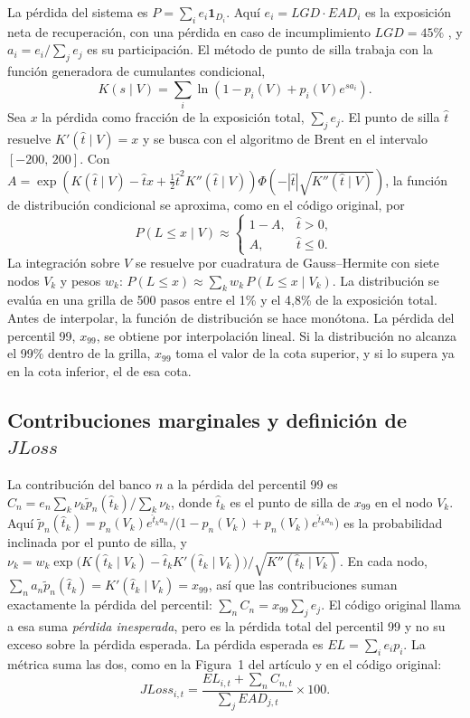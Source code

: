 La pérdida del sistema es $P=\sum_i e_i\mathbf 1_{D_i}$. Aquí $e_i=LGD\cdot EAD_i$ es la exposición neta de recuperación, con una pérdida en caso de incumplimiento $LGD=45\%$ \citep{BIS2006}, y $a_i=e_i/\sum_j e_j$ es su participación. El método de punto de silla \citep{MartinThompsonBrowne2001} trabaja con la función generadora de cumulantes condicional,
\[ K(s\mid V)=\sum_i\ln\!\left(1-p_i(V)+p_i(V)e^{s a_i}\right). \]
Sea $x$ la pérdida como fracción de la exposición total, $\sum_j e_j$. El punto de silla $\hat t$ resuelve $K'(\hat t\mid V)=x$ y se busca con el algoritmo de Brent en el intervalo $[-200,\,200]$. Con $A=\exp\!\left(K(\hat t\mid V)-\hat t x+\tfrac12\hat t^2K''(\hat t\mid V)\right)\Phi\!\left(-|\hat t|\sqrt{K''(\hat t\mid V)}\right)$, la función de distribución condicional se aproxima, como en el código original, por
\[ P(L\le x\mid V)\approx\begin{cases}1-A, & \hat t>0,\\ A, & \hat t\le 0.\end{cases} \]
La integración sobre $V$ se resuelve por cuadratura de Gauss--Hermite con siete nodos $V_k$ y pesos $w_k$: $P(L\le x)\approx\sum_k w_k\,P(L\le x\mid V_k)$. La distribución se evalúa en una grilla de 500 pasos entre el 1\% y el 4,8\% de la exposición total. Antes de interpolar, la función de distribución se hace monótona. La pérdida del percentil 99, $x_{99}$, se obtiene por interpolación lineal. Si la distribución no alcanza el 99\% dentro de la grilla, $x_{99}$ toma el valor de la cota superior, y si lo supera ya en la cota inferior, el de esa cota.

\subsection{Contribuciones marginales y definición de \texorpdfstring{$JLoss$}{JLoss}}

La contribución del banco $n$ a la pérdida del percentil 99 es $C_n=e_n\sum_k\nu_k\tilde p_n(\hat t_k)/\sum_k\nu_k$, donde $\hat t_k$ es el punto de silla de $x_{99}$ en el nodo $V_k$. Aquí $\tilde p_n(\hat t_k)=p_n(V_k)e^{\hat t_k a_n}/\bigl(1-p_n(V_k)+p_n(V_k)e^{\hat t_k a_n}\bigr)$ es la probabilidad inclinada por el punto de silla, y $\nu_k=w_k\exp\!\bigl(K(\hat t_k\mid V_k)-\hat t_kK'(\hat t_k\mid V_k)\bigr)/\sqrt{K''(\hat t_k\mid V_k)}$. En cada nodo, $\sum_n a_n\tilde p_n(\hat t_k)=K'(\hat t_k\mid V_k)=x_{99}$, así que las contribuciones suman exactamente la pérdida del percentil: $\sum_nC_n=x_{99}\sum_je_j$. El código original llama a esa suma \emph{pérdida inesperada}, pero es la pérdida total del percentil 99 y no su exceso sobre la pérdida esperada. La pérdida esperada es $EL=\sum_ie_ip_i$. La métrica suma las dos, como en la Figura~1 del artículo y en el código original:
\[ JLoss_{i,t}=\frac{EL_{i,t}+\sum_nC_{n,t}}{\sum_jEAD_{j,t}}\times100. \]

